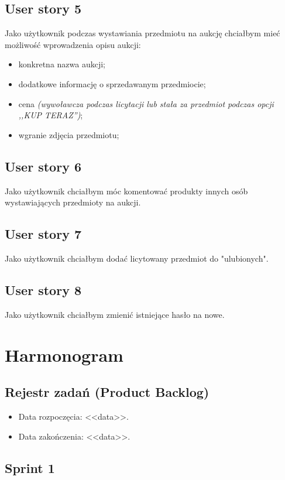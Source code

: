 \documentclass[a4paper]{article}
\begin{document}
\subsection{User story 5}
Jako użytkownik podczas wystawiania przedmiotu na aukcję chciałbym mieć możliwość wprowadzenia opisu aukcji:
\begin{itemize}
	\item konkretna nazwa aukcji;
	\item dodatkowe informację o sprzedawanym przedmiocie;
	\item cena \emph{(wywoławcza podczas licytacji lub stała za przedmiot podczas opcji ,,KUP TERAZ'')};
	\item wgranie zdjęcia przedmiotu;
\end{itemize}

\subsection{User story 6}
Jako użytkownik chciałbym móc komentować produkty innych osób wystawiających przedmioty na aukcji.

\subsection{User story 7}
Jako użytkownik chciałbym dodać licytowany przedmiot do "ulubionych".

\subsection{User story 8}
Jako użytkownik chciałbym zmienić istniejące hasło na nowe.

\section{Harmonogram}

\subsection{Rejestr zadań (Product Backlog)}

\begin{itemize}
\item Data rozpoczęcia: <<data>>.
\item  Data zakończenia: <<data>>.
\end{itemize}

\subsection{Sprint 1}
\end{document}
